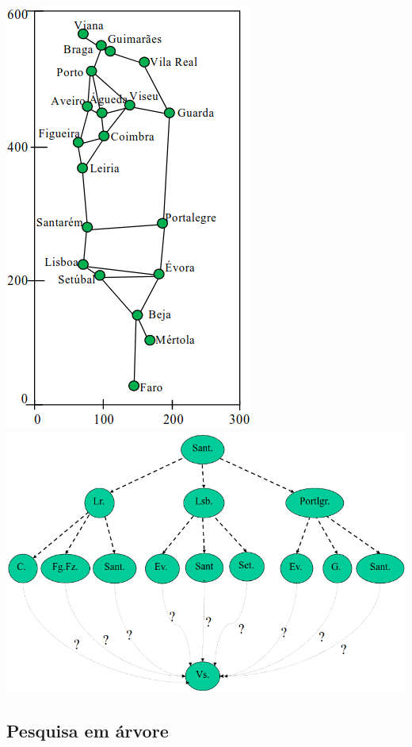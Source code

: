\documentclass{article}
\begin{document}
\begin{center}
  \includegraphics[scale=0.35]{49}
  \includegraphics[scale=0.35]{50}
\end{center}

\pagebreak

\subsection{Pesquisa em árvore}
\end{document}
